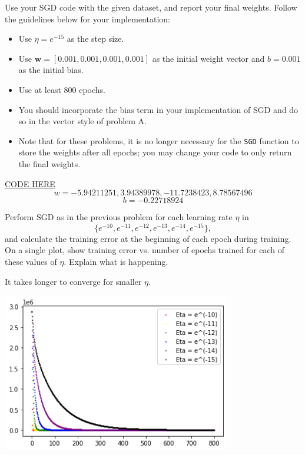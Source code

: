 \begin{problem}[6]
  Use your SGD code with the given dataset, and report your final weights. Follow the guidelines below for your implementation:

  \begin{itemize}
    \item Use $\eta = e^{-15}$ as the step size.  
    \item Use $\mathbf{w} = [0.001, 0.001, 0.001, 0.001]$ as the initial weight vector and $b = 0.001$ as the initial bias.
    \item Use at least 800 epochs.
    \item You should incorporate the bias term in your implementation of SGD and do so in the vector style of problem A.
    \item Note that for these problems, it is no longer necessary for the \texttt{SGD} function to store the weights after all epochs; you may change your code to only return the final weights.
  \end{itemize}
\end{problem}
\begin{solution}
\href{https://colab.research.google.com/drive/1tpWQzEpdqmPHiF7JQ3pcArDQjDq3R2UX?usp=sharing}{CODE HERE}
 $$w = -5.94211251, 3.94389978, -11.7238423, 8.78567496
 $$$$ 
 b = -0.22718924
 $$
\end{solution}

\begin{problem}[2]
  Perform SGD as in the previous problem for each learning rate $\eta$ in \[\{e^{-10}, e^{-11}, e^{-12}, e^{-13}, e^{-14}, e^{-15}\},\] and calculate the training error at the beginning of each epoch during training.  On a single plot, show training error vs. number of epochs trained for each of these values of $\eta$. Explain what is happening.
\end{problem}
\begin{solution}
  It takes longer to converge for smaller $\eta$.
  \begin{center}
    \includegraphics[width=10cm]{set1/images/eta2.png}
\end{center}
\end{solution}


